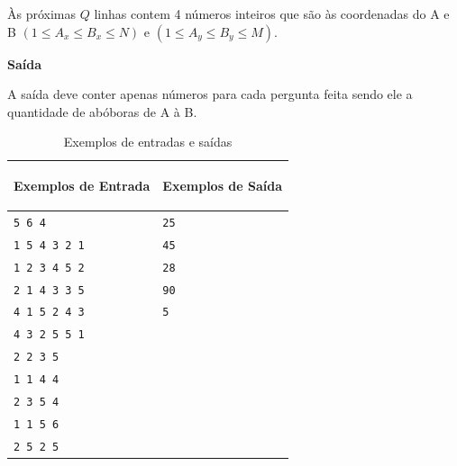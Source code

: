 Às próximas $Q$ linhas contem 4 números inteiros que são às coordenadas do A e B $(1 \leq A_x \leq B_x \leq N)$ e $(1 \leq A_y \leq B_y \leq M)$.

\vspace{0.3cm}
\textbf{Saída}

A saída deve conter apenas números para cada pergunta feita sendo ele a quantidade de abóboras de A à B.

\begin{table}[ht]
    \centering
    \begin{tabular}{|p{7cm}|p{7cm}|}
        \hline
        \begin{center}
            \vspace{-0.3cm}
            \textbf{Exemplos de Entrada}
            \vspace{-0.3cm}
        \end{center} 
         &  
        \begin{center}
            \vspace{-0.3cm}
            \textbf{Exemplos de Saída}
            \vspace{-0.3cm}
        \end{center} \\ \hline
         \texttt{5 6 4} & \texttt{25} \\  
         \texttt{1 5 4 3 2 1} & \texttt{45} \\
         \texttt{1 2 3 4 5 2} & \texttt{28} \\
         \texttt{2 1 4 3 3 5} & \texttt{90} \\
         \texttt{4 1 5 2 4 3} & \texttt{5} \\
         \texttt{4 3 2 5 5 1} & \texttt{} \\
         \texttt{2 2 3 5} & \texttt{} \\
         \texttt{1 1 4 4} & \texttt{} \\
         \texttt{2 3 5 4} & \texttt{} \\
         \texttt{1 1 5 6} & \texttt{} \\
         \texttt{2 5 2 5} & \texttt{} \\
         \hline
    \end{tabular}
    \caption{Exemplos de entradas e saídas}
    \label{tab:inputN}
\end{table}

\newpage 

\begin{center}
\noindent

\end{center}